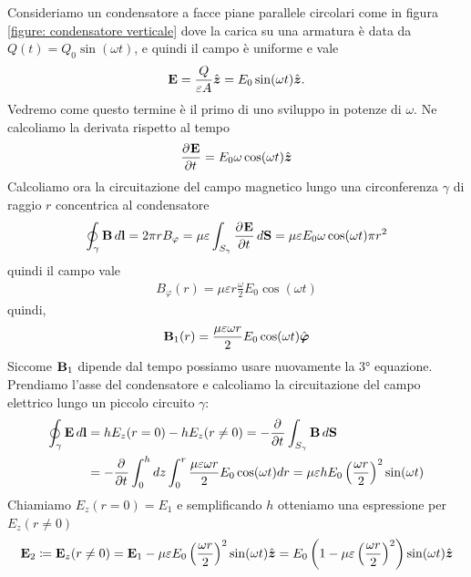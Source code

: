 

Consideriamo un condensatore a facce piane parallele circolari come in figura \ref{figure: condensatore verticale} dove la carica su una armatura è 
data da $ Q(t) = Q_0 \sin(\omega t) $, e quindi il campo è uniforme e vale  
\begin{equation}
  \mathbf{ E } = \frac{Q}{\varepsilon A} \hat{\boldsymbol{z}} = E_0 \sin(\omega t) \hat{\boldsymbol{z}}.
\end{equation}
Vedremo come questo termine è il primo di 
uno sviluppo in potenze di $ \omega $. Ne calcoliamo la derivata rispetto al tempo
\begin{equation}
  \frac{\partial^{} {\mathbf{ E }}}{\partial {t}^{}} = E_0 \omega \cos(\omega t) \hat{\boldsymbol{z}}
\end{equation}
Calcoliamo ora la circuitazione del campo magnetico lungo una circonferenza $ \gamma $ di raggio $ r $ concentrica al condensatore
\begin{align}
  \oint_{\gamma} \mathbf{ B }  \,d\mathbf{ l } = 2\pi r B_{\varphi} = \mu \varepsilon \int_{S_{\gamma}} \frac{\partial^{} {\mathbf{ E }}}{\partial {t}^{}} \,d\mathbf{ S } 
  = \mu \varepsilon E_0 \omega \cos(\omega t) \pi r^2
\end{align}
quindi il campo vale
\begin{align}
  B_{\varphi}(r) = \mu \varepsilon  r \frac{\omega}{2} E_0\cos(\omega t)
\end{align}
quindi,
\begin{equation}
  \mathbf{ B }_1(r) = \frac{\mu \varepsilon \omega r}{2} E_0 \cos(\omega t) \hat{\boldsymbol{\varphi}}
\end{equation}
Siccome $ \mathbf{ B }_1 $ dipende dal tempo possiamo usare nuovamente la 3° equazione. 
Prendiamo l'asse del condensatore e calcoliamo la circuitazione del campo elettrico lungo un piccolo circuito $ \gamma $:
\begin{align}
  \oint_{\gamma} \mathbf{ E } \, d\mathbf{ l } &= h E_z(r= 0) - h E_z (r \neq 0)
  = -\frac{\partial^{} {}}{\partial {t}^{}} \int_{S_\gamma} \mathbf{ B } \, d\mathbf{ S } 
  \\
  &= - \frac{\partial^{} {}}{\partial {t}^{}} \int_0^h dz \int_0^r \frac{\mu \varepsilon \omega r}{2} E_0 \cos(\omega t) dr 
  = \mu \varepsilon h E_0 \left( \frac{\omega r}{2} \right)^2 \sin(\omega t)
\end{align}
Chiamiamo $ E_z(r = 0) = E_1 $ e semplificando $ h $ otteniamo una espressione per $ E_z(r \neq 0) $ 
\begin{align}
  \mathbf{ E }_2 \coloneqq \mathbf{ E }_z(r \neq 0) = \mathbf{ E }_1 - \mu \varepsilon E_0 \left( \frac{\omega r}{2} \right)^2 \sin(\omega t) \hat{\boldsymbol{z}}
  = E_0 \left( 1 - \mu \varepsilon \left( \frac{\omega r}{2} \right)^2  \right) \sin(\omega t) \hat{\boldsymbol{z}}
\end{align}

